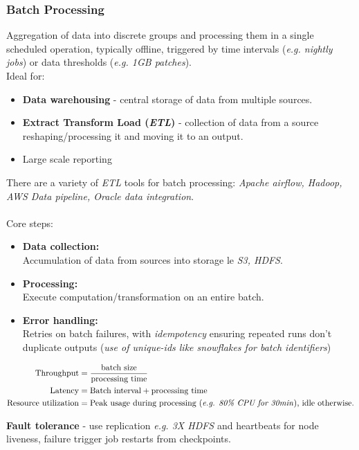 \documentclass[11pt,a4paper]{article}
\begin{document}
	\subsubsection{Batch Processing}
	Aggregation of data into discrete groups and processing them in a single scheduled operation, typically offline, triggered by time intervals (\textit{e.g. nightly jobs}) or data thresholds (\textit{e.g. 1GB patches}).\\
	Ideal for:
	\begin{itemize}
		\item \textbf{Data warehousing} - central storage of data from multiple sources.
		\item \textbf{Extract Transform Load (\textit{ETL})} - collection of data from a source reshaping/processing it and moving it to an output.
		\item Large scale reporting
	\end{itemize}
	There are a variety of \textit{ETL} tools for batch processing: \textit{Apache airflow, Hadoop, AWS Data pipeline, Oracle data integration}.\\
	\\Core steps:
	\begin{itemize}
		\item \textbf{Data collection:}\\Accumulation of data from sources into storage le \textit{S3, HDFS}.
		\item \textbf{Processing:}\\Execute computation/transformation on an entire batch.
		\item \textbf{Error handling:}\\Retries on batch failures, with \textit{idempotency} ensuring repeated runs don't duplicate outputs (\textit{use of unique-ids like snowflakes for batch identifiers})
	\end{itemize}
	
	\begin{flushleft}	
		\[
		\begin{aligned}
			\text{Throughput} &= \frac{\text{batch size}}{\text{processing time}} \\
			\text{Latency} &= \text{Batch interval} + \text{processing time} \\
			\text{Resource utilization} &= \text{Peak usage during processing (\textit{e.g. 80\% CPU for 30min}), idle otherwise.}
		\end{aligned}
		\]
	\end{flushleft}
	\textbf{Fault tolerance} - use replication \textit{e.g. 3X HDFS} and heartbeats for node liveness, failure trigger job restarts from checkpoints.
	
\end{document}
